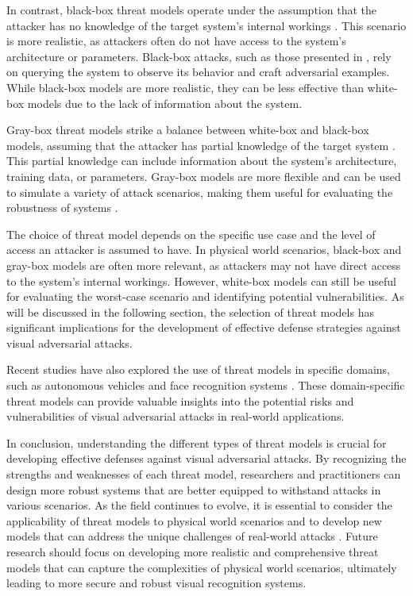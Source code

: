 \documentclass[11pt,a4paper]{article}
\begin{document}
In contrast, black-box threat models operate under the assumption that the attacker has no knowledge of the target system's internal workings \cite{doi:10.1049/cit2.12028}. This scenario is more realistic, as attackers often do not have access to the system's architecture or parameters. Black-box attacks, such as those presented in \cite{doi:10.1109/cvpr.2019.00790}, rely on querying the system to observe its behavior and craft adversarial examples. While black-box models are more realistic, they can be less effective than white-box models due to the lack of information about the system.

Gray-box threat models strike a balance between white-box and black-box models, assuming that the attacker has partial knowledge of the target system \cite{doi:10.1016/j.eng.2019.12.012}. This partial knowledge can include information about the system's architecture, training data, or parameters. Gray-box models are more flexible and can be used to simulate a variety of attack scenarios, making them useful for evaluating the robustness of systems \cite{doi:10.1109/access.2018.2807385}.

The choice of threat model depends on the specific use case and the level of access an attacker is assumed to have. In physical world scenarios, black-box and gray-box models are often more relevant, as attackers may not have direct access to the system's internal workings. However, white-box models can still be useful for evaluating the worst-case scenario and identifying potential vulnerabilities. As will be discussed in the following section, the selection of threat models has significant implications for the development of effective defense strategies against visual adversarial attacks.

Recent studies have also explored the use of threat models in specific domains, such as autonomous vehicles \cite{doi:10.1109/jiot.2021.3099164} and face recognition systems \cite{doi:10.1016/j.patcog.2022.109009}. These domain-specific threat models can provide valuable insights into the potential risks and vulnerabilities of visual adversarial attacks in real-world applications.

In conclusion, understanding the different types of threat models is crucial for developing effective defenses against visual adversarial attacks. By recognizing the strengths and weaknesses of each threat model, researchers and practitioners can design more robust systems that are better equipped to withstand attacks in various scenarios. As the field continues to evolve, it is essential to consider the applicability of threat models to physical world scenarios and to develop new models that can address the unique challenges of real-world attacks \cite{doi:10.1109/cvpr42600.2020.00108}. Future research should focus on developing more realistic and comprehensive threat models that can capture the complexities of physical world scenarios, ultimately leading to more secure and robust visual recognition systems.
\end{document}

